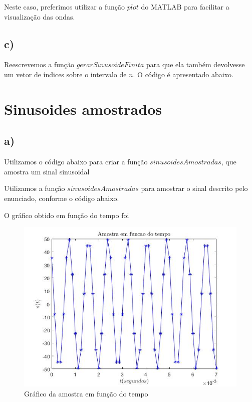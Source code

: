 \documentclass[a4paper, 12pt]{article}
\begin{document}
Neste caso, preferimos utilizar a função $plot$ do MATLAB para facilitar a visualização das ondas.

\subsection{c)}
Reescrevemos a função $gerarSinusoideFinita$ para que ela também devolvesse um vetor de índices sobre o intervalo de $n$. O código é apresentado abaixo.



\section{Sinusoides amostrados}

\subsection{a)}
Utilizamos o código abaixo para criar a função $sinusoidesAmostradas$, que amostra um sinal sinusoidal

\newpage



Utilizamos a função $sinusoidesAmostradas$ para amostrar o sinal descrito pelo enunciado, conforme o código abaixo.



O gráfico obtido em função do tempo foi

\begin{figure}[H]
	\centering
	\includegraphics[scale=0.7]{../Imagens/ex3/a1.jpg}  
	\caption{Gráfico da amostra em função do tempo}
	\label{fig:3a1}
\end{figure}
\end{document}
